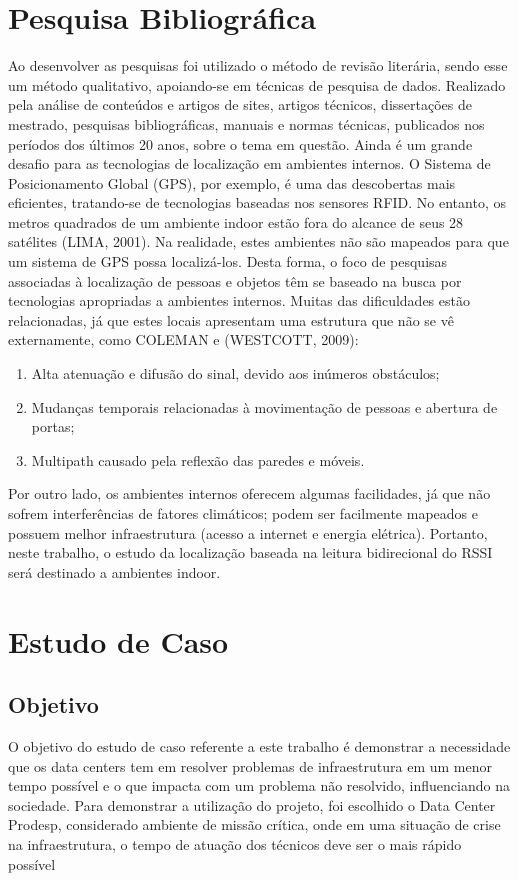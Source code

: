 \documentclass[
	article,			%
	12pt,				%
	oneside,			%
	a4paper,			%
	english,			%
	brazil,				%
	sumario=tradicional
	]{abntex2}
\begin{document}
\section{Pesquisa Bibliográfica}
Ao desenvolver as pesquisas foi utilizado o método de revisão literária, sendo esse um método qualitativo, apoiando-se em técnicas de pesquisa de dados. Realizado pela análise de conteúdos e artigos de sites, artigos técnicos, dissertações de mestrado, pesquisas bibliográficas, manuais e normas técnicas, publicados nos períodos dos últimos 20 anos, sobre o tema em questão.
Ainda é um grande desafio para as tecnologias de localização em ambientes internos. O Sistema de Posicionamento Global (GPS), por exemplo, é uma das descobertas mais eficientes, tratando-se de tecnologias baseadas nos sensores RFID. No entanto, os metros quadrados de um ambiente indoor estão fora do alcance de seus 28 satélites (LIMA, 2001). 
Na realidade, estes ambientes não são mapeados para que um sistema de GPS possa localizá-los. Desta forma, o foco de pesquisas associadas à localização de pessoas e objetos têm se baseado na busca por tecnologias apropriadas a ambientes internos. Muitas das dificuldades estão relacionadas, já que estes locais apresentam uma estrutura que não se vê externamente, como COLEMAN e (WESTCOTT, 2009):
\begin{enumerate}
	\item Alta atenuação e difusão do sinal, devido aos inúmeros obstáculos;
	\item Mudanças temporais relacionadas à movimentação de pessoas e abertura de portas;
	\item Multipath causado pela reflexão das paredes e móveis.	
	\end{enumerate}	
Por outro lado, os ambientes internos oferecem algumas facilidades, já que não sofrem interferências de fatores climáticos; podem ser facilmente mapeados e possuem melhor infraestrutura (acesso a internet e energia elétrica). Portanto, neste trabalho, o estudo da localização baseada na leitura bidirecional do RSSI será destinado a ambientes indoor.

\section{Estudo de Caso}
\subsection{Objetivo}
O objetivo do estudo de caso referente a este trabalho é demonstrar a necessidade que os data centers tem em resolver problemas de infraestrutura em um menor tempo possível e o que impacta com um problema não resolvido, influenciando na sociedade.
Para demonstrar a utilização do projeto, foi escolhido o Data Center Prodesp, considerado ambiente de missão crítica, onde em uma situação de crise na infraestrutura, o tempo de atuação dos técnicos deve ser o mais rápido possível
\end{document}
